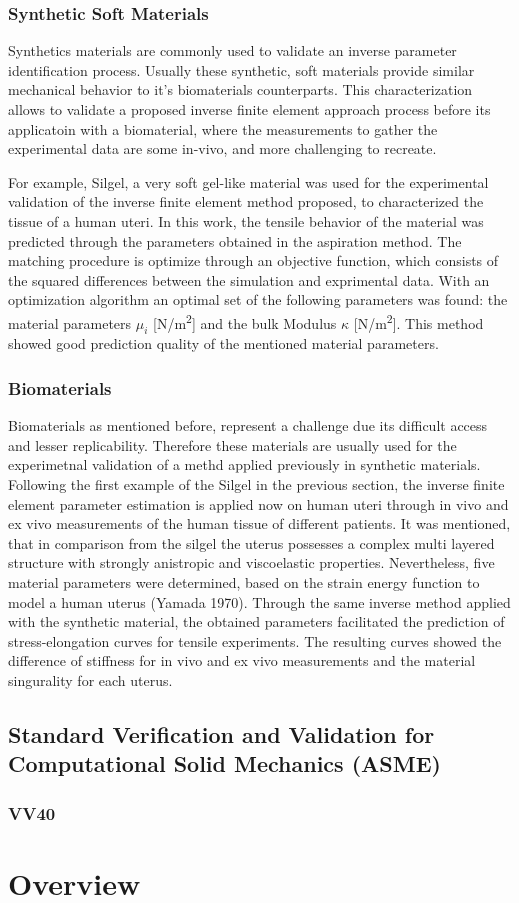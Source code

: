 \subsubsection*{Synthetic Soft Materials}

Synthetics materials are commonly used to validate an inverse parameter identification process. 
Usually these synthetic, soft materials provide similar mechanical behavior to it's biomaterials 
counterparts. This characterization allows to validate a proposed inverse finite element approach process
before its applicatoin with a biomaterial, where the measurements to gather the experimental data are 
some in-vivo, and more challenging to recreate.


For example, Silgel, a very soft gel-like material \cite{Kauer2002} was used for the experimental 
validation of the inverse finite element method proposed, to characterized the tissue of 
a human uteri. In this work, the tensile behavior of the material was predicted through the 
parameters obtained in the aspiration method. The matching procedure is optimize through 
an objective function, which consists of the squared differences between the simulation 
and exprimental data. With an optimization algorithm an optimal set of the following parameters 
was found: the material parameters \(\mu_i\) [N/m\textsuperscript{2}] and the bulk Modulus
\(\kappa\) [N/m\textsuperscript{2}]. This method showed good prediction quality of the mentioned 
material parameters.

\subsubsection*{Biomaterials}
Biomaterials as mentioned before, represent a challenge due its difficult access and lesser replicability.
Therefore these materials are usually used for the experimetnal validation of a methd applied previously in 
synthetic materials. 
 Following the first example of the Silgel in the previous section, the inverse finite element parameter
 estimation is applied now on human uteri \cite{Kauer2002} through in vivo and ex vivo measurements of the human tissue of 
 different patients. It was mentioned, that in comparison from the silgel the uterus possesses a complex 
 multi layered structure with strongly anistropic and viscoelastic properties. Nevertheless, five 
 material parameters were determined, based on the strain energy function to model a human uterus (Yamada 1970).
Through the same inverse method applied with the synthetic material, the obtained parameters facilitated the prediction of stress-elongation curves for tensile experiments. The 
 resulting curves showed the difference of stiffness for in vivo and ex vivo measurements and the material 
 singurality for each uterus.


\subsection{Standard Verification and Validation for Computational Solid Mechanics (ASME)}
\subsubsection*{VV40}



\section{Overview}